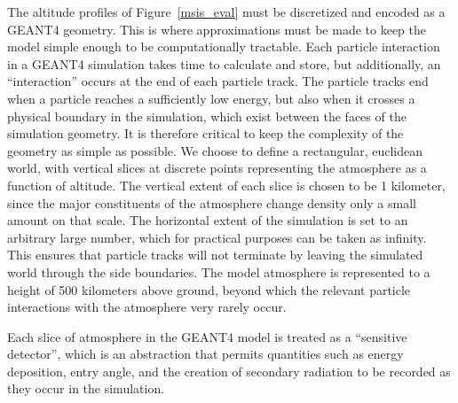 The altitude profiles of Figure~\ref{msis_eval} must be discretized and encoded as a GEANT4 geometry. This is where approximations must be made to keep the model simple enough to be computationally tractable. Each particle interaction in a GEANT4 simulation takes time to calculate and store, but additionally, an ``interaction'' occurs at the end of each particle track. The particle tracks end when a particle reaches a sufficiently low energy, but also when it crosses a physical boundary in the simulation, which exist between the faces of the simulation geometry. It is therefore critical to keep the complexity of the geometry as simple as possible. We choose to define a rectangular, euclidean world, with vertical slices at discrete points representing the atmosphere as a function of altitude. The vertical extent of each slice is chosen to be 1 kilometer, since the major constituents of the atmosphere change density only a small amount on that scale. The horizontal extent of the simulation is set to an arbitrary large number, which for practical purposes can be taken as infinity. This ensures that particle tracks will not terminate by leaving the simulated world through the side boundaries. The model atmosphere is represented to a height of 500 kilometers above ground, beyond which the relevant particle interactions with the atmosphere very rarely occur. 

Each slice of atmosphere in the GEANT4 model is treated as a ``sensitive detector'', which is an abstraction that permits quantities such as energy deposition, entry angle, and the creation of secondary radiation to be recorded as they occur in the simulation. 
    
